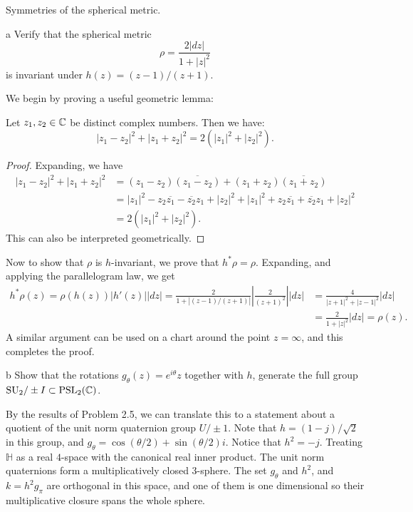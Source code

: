 \documentclass{pset}
\begin{document}
\begin{problem}{2.4}
  Symmetries of the spherical metric.
\end{problem}

\begin{parts}
  \begin{part}{a}
    Verify that the spherical metric
    \[\rho = \frac{2|dz|}{1+|z|^2}\]
    is invariant under $h(z) = (z-1) / (z+1)$.
  \end{part}

  We begin by proving a useful geometric lemma:
  \begin{claim}
    Let $z_1, z_2\in \mathbb{C}$ be distinct complex numbers. Then we have:
    \[
      |z_1-z_2|^2 + |z_1+z_2|^2 = 2(|z_1|^2 + |z_2|^2).
    \]
  \end{claim}
  \begin{proof}
    Expanding, we have
    \[\begin{aligned}
      |z_1-z_2|^2 + |z_1+z_2|^2 &= (z_1-z_2)\overline{(z_1-z_2)} + (z_1+z_2)\overline{(z_1+z_2)}\\ &= |z_1|^2 - z_2\overline{z_1} - \overline{z_2}z_1 + |z_2|^2 + |z_1|^2 + z_2\overline{z_1} + \overline{z_2}z_1 + |z_2|^2\\
                                &= 2(|z_1|^2 + |z_2|^2).
    \end{aligned}\]
    This can also be interpreted geometrically.
  \end{proof}

  Now to show that $\rho$ is $h$-invariant, we prove that $h^*\rho = \rho$. Expanding, and applying the parallelogram law, we get
  \[\begin{aligned}
    h^* \rho(z) = \rho(h(z))|h'(z)||dz| = \frac{2}{1+\left|(z-1)/(z+1)\right|}\left|\frac{2}{(z+1)^2}\right||dz| &= \frac{4}{|z+1|^2+|z-1|^2}|dz|\\
                                                                                                                                        &=\frac{2}{1+|z|^2}|dz| = \rho(z).
  \end{aligned}\]
  A similar argument can be used on a chart around the point $z=\infty$, and this completes the proof.

  \begin{part}{b}
    Show that the rotations $g_\theta(z) = e^{i\theta}z$ together with $h$, generate the full group $\textrm{SU}_2 / \pm I\subset \textrm{PSL}_2(\mathbb{C})$.
  \end{part}

  By the results of Problem 2.5, we can translate this to a statement about a quotient of the unit norm quaternion group $U/\pm 1$. Note that $h = (1-j)/\sqrt{2}$ in this group, and $g_\theta = \cos(\theta/2) + \sin(\theta/2)i$. Notice that $h^2=-j$. Treating $\mathbb{H}$ as a real $4$-space with the canonical real inner product. The unit norm quaternions form a multiplicatively closed $3$-sphere. The set $g_\theta$ and $h^2$, and $k=h^2 g_{\pi}$ are orthogonal in this space, and one of them is one dimensional so their multiplicative closure spans the whole sphere.
\end{parts}
\end{document}
